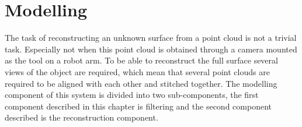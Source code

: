 \chapter{Modelling}
The task of reconstructing an unknown surface from a point cloud is not a trivial task. Especially not when this point cloud is obtained through a camera mounted as the tool on a robot arm. To be able to reconstruct the full surface several views of the object are required, which mean that several point clouds are required to be aligned with each other and stitched together. The modelling component of this system is divided into two sub-components, the first component described in this chapter is filtering and the second component described is the reconstruction component. 


%